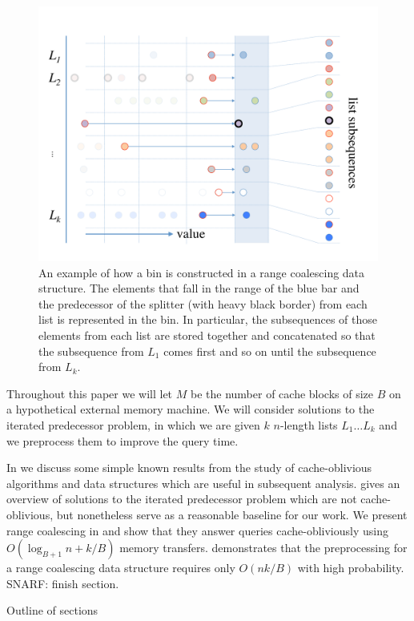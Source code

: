 \begin{figure}[h]
\includegraphics[scale=.33333]{cache-oblivious-fractional-cascading-c.pdf}
\caption{An example of how a bin is constructed in a range coalescing data
structure.  The elements that fall in the range of the blue bar and the predecessor
of the splitter (with heavy black border) from each list is represented in the bin.
In particular, the subsequences of those elements from each list are stored together
and concatenated so that the subsequence from $L_1$ comes first and so on until the
subsequence from $L_k$.}
\label{fig:coalesced_bin} 
\end{figure}

Throughout this paper we will let $M$ be the number of cache blocks of size $B$
on a hypothetical external memory machine.  We will consider solutions to the iterated
predecessor problem, in which we are given $k$ $n$-length lists $L_1 \ldots L_k$ and
we preprocess them to improve the query time.

In  we discuss some simple known results from the study of
cache-oblivious algorithms and data structures which are useful in subsequent analysis.
 gives an overview of solutions to the iterated predecessor problem
which are not cache-oblivious, but nonetheless serve as a reasonable baseline for
our work.  We present range coalescing in  and show that they
answer queries cache-obliviously using $O(\log_{B+1} n + k/B)$ memory transfers.
 demonstrates that the preprocessing for a range coalescing
data structure requires only $O(nk/B)$ with high probability.  SNARF: finish section.


Outline of sections
